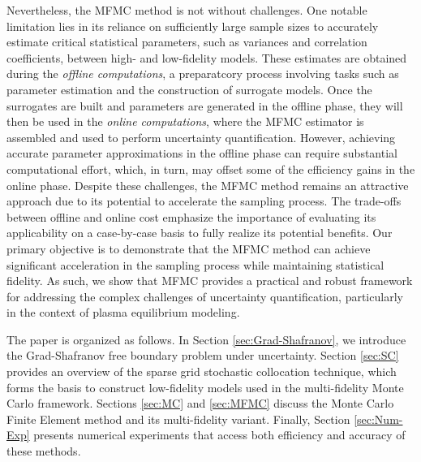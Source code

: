 Nevertheless, the MFMC method is not without challenges. One notable limitation lies in its reliance on sufficiently large sample sizes to accurately estimate critical statistical parameters, such as variances and correlation coefficients, between high- and low-fidelity models. These estimates are obtained during the \textit{offline computations}, a preparatcory process involving tasks such as parameter estimation and the construction of surrogate models. Once the surrogates are built and parameters are generated in the offline phase, they will then be used in the \textit{online computations}, where the MFMC estimator is assembled and used to perform uncertainty quantification. However, achieving accurate parameter approximations in the offline phase can require substantial computational effort, which, in turn, may offset some of the efficiency gains in the online phase. Despite these challenges, the MFMC method remains an attractive approach due to its potential to accelerate the sampling process. The trade-offs between offline and online cost emphasize the importance of evaluating its applicability on a case-by-case basis to fully realize its potential benefits.  Our primary objective is to demonstrate that the MFMC method can achieve significant acceleration in the sampling process while maintaining statistical fidelity. As such, we show that MFMC provides a practical and robust framework for addressing the complex challenges of uncertainty quantification, particularly in the context of plasma equilibrium modeling.

 
The paper is organized as follows. In Section \ref{sec:Grad-Shafranov}, we introduce the Grad-Shafranov free boundary problem under uncertainty. Section \ref{sec:SC} provides an overview of the sparse grid stochastic collocation technique, which forms the basis to construct low-fidelity models used in the multi-fidelity Monte Carlo framework. Sections \ref{sec:MC} and \ref{sec:MFMC} discuss the Monte Carlo Finite Element method and its multi-fidelity variant. Finally, Section \ref{sec:Num-Exp} presents numerical experiments that access both efficiency and accuracy of these methods.



